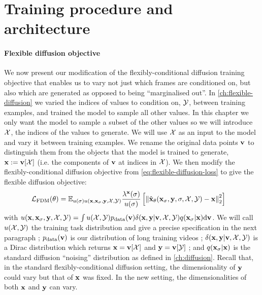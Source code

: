 \section{Training procedure and architecture} \label{sec:fdm-method}

\paragraph{Flexible diffusion objective}
We now present our modification of the flexibly-conditional diffusion training objective that enables us to vary not just which frames are conditioned on, but also which are generated as opposed to being ``marginalised out''. In \cref{ch:flexible-diffusion} we varied the indices of values to condition on, ${\mathcal{Y}}$, between training examples, and trained the model to sample all other values. In this chapter we only want the model to sample a subset of the other values so we will introduce ${\mathcal{X}}$, the indices of the values to generate. We will use ${\mathcal{X}}$ as an input to the model and vary it between training examples. We rename the original data points ${\mathbf{v}}$ to distinguish them from the objects that the model is trained to generate, ${\mathbf{x}} := {\mathbf{v}}[{\mathcal{X}}]$ (i.e. the components of ${\mathbf{v}}$ at indices in ${\mathcal{X}}$). We then modify the flexibly-conditional diffusion objective from \cref{eq:flexible-diffusion-loss} to give the flexible diffusion objective:
\begin{align} \label{eq:fdm-loss}
    \mathcal{L}_\text{FDM}(\theta) &= 
    \mathbb{E}_{u(\sigma) u({\mathbf{x}}, {\mathbf{x}}_\sigma, {\mathbf{y}}, {\mathcal{X}}, {\mathcal{Y}})} \frac{\lambda^{\mathbf{x}}(\sigma)}{u(\sigma)} \left[ 
    \left\| \hat{{\mathbf{x}}}_\theta({\mathbf{x}}_\sigma, {\mathbf{y}}, \sigma, {\mathcal{X}}, {\mathcal{Y}}) - {\mathbf{x}} \right\|_2^2 \right]
\end{align}
with $u({\mathbf{x}}, {\mathbf{x}}_\sigma, {\mathbf{y}}, {\mathcal{X}}, {\mathcal{Y}}) = \int u({\mathcal{X}}, {\mathcal{Y}})p_{\rm{data}}({\mathbf{v}})\delta({\mathbf{x}},{\mathbf{y}}|{\mathbf{v}},{\mathcal{X}},{\mathcal{Y}})q({\mathbf{x}}_\sigma|{\mathbf{x}}) \mathrm{d}{\mathbf{v}}$. We will call $u({\mathcal{X}}, {\mathcal{Y}})$ the training task distribution and give a precise specification in the next paragraph ; $p_{\rm{data}}({\mathbf{v}})$ is our distribution of long training videos ; $\delta({\mathbf{x}},{\mathbf{y}}|{\mathbf{v}},{\mathcal{X}},{\mathcal{Y}})$ is a Dirac distribution which returns ${\mathbf{x}} = {\mathbf{v}}[{\mathcal{X}}]$ and ${\mathbf{y}} = {\mathbf{v}}[{\mathcal{Y}}]$ ; and $q({\mathbf{x}}_\sigma | {\mathbf{x}})$ is the standard diffusion ``noising'' distribution as defined in \cref{ch:diffusion}. Recall that, in the standard flexibly-conditional diffusion setting, the dimensionality of ${\mathbf{y}}$ could vary but that of ${\mathbf{x}}$ was fixed. In the new setting, the dimensionalities of both ${\mathbf{x}}$ and ${\mathbf{y}}$ can vary.

